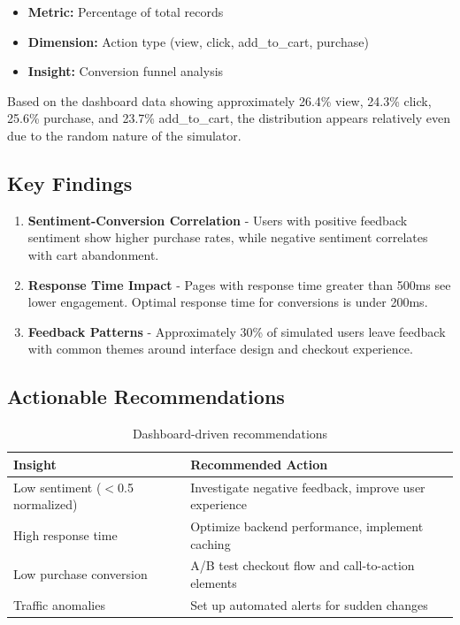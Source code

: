 \documentclass[12pt,a4paper]{article}
\begin{document}
\begin{itemize}
    \item \textbf{Metric:} Percentage of total records
    \item \textbf{Dimension:} Action type (view, click, add\_to\_cart, purchase)
    \item \textbf{Insight:} Conversion funnel analysis
\end{itemize}

Based on the dashboard data showing approximately 26.4\% view, 24.3\% click, 25.6\% purchase, and 23.7\% add\_to\_cart, the distribution appears relatively even due to the random nature of the simulator.

\subsection{Key Findings}

\begin{enumerate}
    \item \textbf{Sentiment-Conversion Correlation} - Users with positive feedback sentiment show higher purchase rates, while negative sentiment correlates with cart abandonment.
    
    \item \textbf{Response Time Impact} - Pages with response time greater than 500ms see lower engagement. Optimal response time for conversions is under 200ms.
    
    \item \textbf{Feedback Patterns} - Approximately 30\% of simulated users leave feedback with common themes around interface design and checkout experience.
\end{enumerate}

\subsection{Actionable Recommendations}

\begin{table}[H]
\centering
\begin{tabular}{|l|p{8cm}|}
\hline
\textbf{Insight} & \textbf{Recommended Action} \\
\hline
Low sentiment ($<$0.5 normalized) & Investigate negative feedback, improve user experience \\
\hline
High response time & Optimize backend performance, implement caching \\
\hline
Low purchase conversion & A/B test checkout flow and call-to-action elements \\
\hline
Traffic anomalies & Set up automated alerts for sudden changes \\
\hline
\end{tabular}
\caption{Dashboard-driven recommendations}
\end{table}
\end{document}
